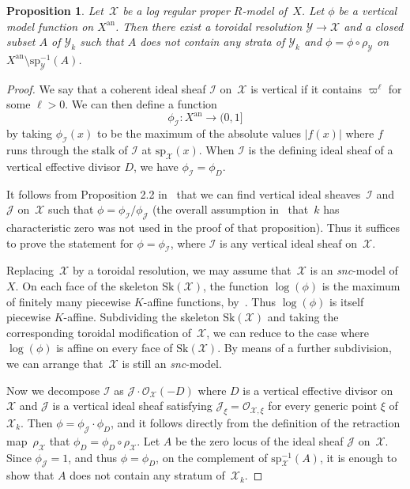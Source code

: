 \documentclass[JEP,XML,SOM,Unicode,NoFloatCountersInSection]{cedram}
\let\mathcal\mathscr
\newtheorem{prop}[equation]{Proposition}
\theoremstyle{definition}
\numberwithin{equation}{subsection}
\newcommand{\cX}{\ensuremath{\mathscr{X}}}
\newcommand{\cY}{\ensuremath{\mathscr{Y}}}
\newcommand{\snc}{\textit{snc}}
\newcommand{\an}{\mathrm{an}}
\newcommand{\Sk}{\mathrm{Sk}}
\newcommand{\spe}{\mathrm{sp}}
\let\unif\varpi
\begin{document}
\begin{prop}\label{prop:adapted}
Let~$\cX$ be a log regular proper $R$\nobreakdash-model of~$X$. Let $\phi$ be a vertical model function on $X^{\an}$. Then there exist a toroidal resolution $\cY\to \cX$ and a closed subset $A$ of $\cY_k$ such that $A$ does not contain any strata of $\cY_k$ and $\phi=\phi\circ \rho_{\cY}$ on $X^{\an}\setminus \spe^{-1}_{\cY}(A)$.
\end{prop}
\begin{proof}
We say that a coherent ideal sheaf $\mathscr{I}$ on~$\cX$ is vertical if it contains $\unif^\ell$ for some $\ell>0$. We can then define a function
\[
\phi_{\mathscr{I}}\colon X^{\an}\to (0,1]
\]
by taking $\phi_{\mathscr{I}}(x)$ to be the maximum of the absolute values $|f(x)|$ where $f$ runs through the stalk of $\mathscr{I}$ at $\spe_{\cX}(x)$. When $\mathscr{I}$ is the defining ideal sheaf of a vertical effective divisor $D$, we have $\phi_{\mathscr{I}}=\phi_D$.

It follows from Proposition 2.2 in~\cite{BFJ16} that we can find vertical ideal sheaves~$\mathscr{I}$ and $\mathscr{J}$ on~$\cX$ such that $\phi=\phi_{\mathscr{I}}/\phi_{\mathscr{J}}$ (the overall assumption in~\cite{BFJ16} that~$k$ has characteristic zero was not used in the proof of that proposition). Thus it suffices to prove the statement for $\phi=\phi_{\mathscr{I}}$, where $\mathscr{I}$ is any vertical ideal sheaf on~$\cX$.

Replacing~$\cX$ by a toroidal resolution, we may assume that~$\cX$ is an \snc-model of~$X$.
On each face of the skeleton $\Sk(\cX)$, the function $\log(\phi)$ is the maximum of finitely many piecewise $K$\nobreakdash-affine functions, by~\cite[3.2.2]{MuNi}. Thus $\log(\phi)$ is itself piecewise $K$\nobreakdash-affine. Subdividing the skeleton $\Sk(\cX)$ and taking the corresponding toroidal modification of~$\cX$, we can reduce to the case where $\log(\phi)$ is affine on every face of $\Sk(\cX)$. By means of a further subdivision, we can arrange that~$\cX$ is still an \snc-model.

Now we decompose $\mathscr{I}$ as $\mathscr{J}\cdot \mathcal{O}_{\cX}(-D)$ where $D$ is a vertical effective divisor on~$\cX$ and $\mathscr{J}$ is a vertical ideal sheaf
satisfying $\mathscr{J}_{\xi}=\mathcal{O}_{\cX,\xi}$ for every generic point $\xi$ of~$\cX_k$. Then $\phi=\phi_{\mathscr{J}}\cdot \phi_D$, and it follows directly from the definition of the retraction map~$\rho_{\cX}$ that $\phi_D=\phi_D\circ \rho_{\cX}$. Let $A$ be the zero locus of the ideal sheaf $\mathscr{J}$ on~$\cX$. Since $\phi_{\mathscr{J}}=1$, and thus $\phi=\phi_D$, on the complement of $\spe^{-1}_{\cX}(A)$, it is enough to show that $A$ does not contain any stratum of~$\cX_k$.


\end{proof}
\end{document}
